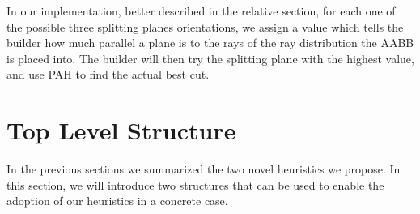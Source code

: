 \documentclass[11pt,a4paper,twocolumn]{article}
\begin{document}
\begin{figure}[H]
{    }
    \label{fig:splitting_overlap}
\end{figure}

In our implementation, better described in the relative section, for each one of the possible three splitting planes orientations, we assign a value which tells the builder how much parallel a plane is to the rays of the ray distribution the AABB is placed into. The builder will then try the splitting plane with the highest value, and use PAH to find the actual best cut.

\section{Top Level Structure}
In the previous sections we summarized the two novel heuristics we propose. In this section, we will introduce two structures that can be used to enable the adoption of our heuristics in a concrete case.


\end{document}
